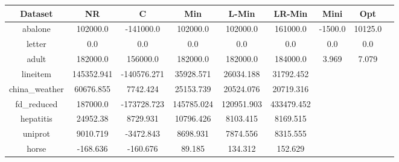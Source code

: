 \documentclass[11pt]{book}
\begin{document}
\begin{table}

	\centering
	
\begin{tabular}{|c|c|c|c|c|c|c|c|c|}

    \hline
    Dataset &
    	NR &
    	C &
    	Min &
    	L-Min &
    	LR-Min &
    	Mini &
    	Opt \\
    	    
    \hline
    
abalone & 102000.0 & -141000.0 & 102000.0 & 102000.0 & 161000.0 & -1500.0 & 10125.0 \\                                                                                                                               
letter & 0.0 & 0.0 & 0.0 & 0.0 & 0.0 & 0.0 & 0.0 \\                                                                                                                                                                  
adult & 182000.0 & 156000.0 & 182000.0 & 182000.0 & 184000.0 & 3.969 & 7.079 \\                                                                                                                                      
lineitem & 145352.941 & -140576.271 & 35928.571 & 26034.188 & 31792.452 && \\                                                                                                                                           
china\_weather & 60676.855 & 7742.424 & 25153.739 & 20524.076 & 20719.316 && \\                                                                                                                                          
fd\_reduced & 187000.0 & -173728.723 & 145785.024 & 120951.903 & 433479.452 && \\                                                                                                                                        
hepatitis & 24952.38 & 8729.931 & 10796.426 & 8103.415 & 8169.515 && \\                                                                                                                                                 
uniprot & 9010.719 & -3472.843 & 8698.931 & 7874.556 & 8315.555 && \\                                                                                                                                                   
horse & -168.636 & -160.676 & 89.185 & 134.312 & 152.629 && \\                                                                                                                                                          

\end{tabular}
\end{table}
\end{document}
